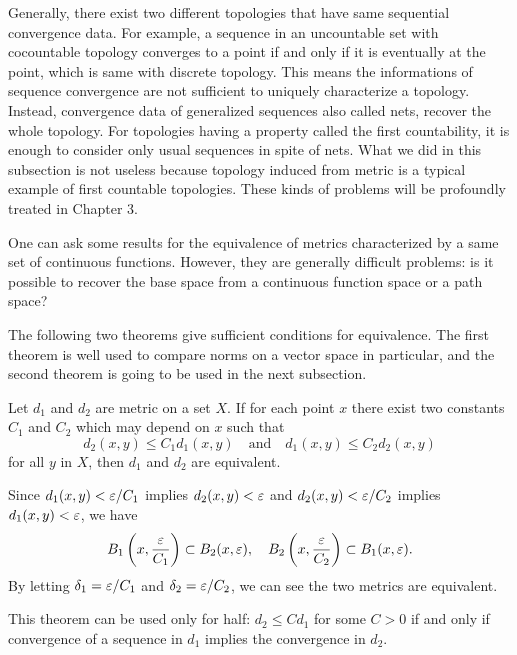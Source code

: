 \begin{rmk}
Generally, there exist two different topologies that have same sequential convergence data.
For example, a sequence in an uncountable set with cocountable topology converges to a point if and only if it is eventually at the point, which is same with discrete topology.
This means the informations of sequence convergence are not sufficient to uniquely characterize a topology.
Instead, convergence data of generalized sequences also called nets, recover the whole topology.
For topologies having a property called the first countability, it is enough to consider only usual sequences in spite of nets.
What we did in this subsection is not useless because topology induced from metric is a typical example of first countable topologies.
These kinds of problems will be profoundly treated in Chapter 3.
\end{rmk}
\begin{rmk}
One can ask some results for the equivalence of metrics characterized by a same set of continuous functions.
However, they are generally difficult problems: is it possible to recover the base space from a continuous function space or a path space?
\end{rmk}


The following two theorems give sufficient conditions for equivalence.
The first theorem is well used to compare norms on a vector space in particular, and the second theorem is going to be used in the next subsection.

\begin{thm}\label{thm:equivalent metrics by inequalities}
Let $d_1$ and $d_2$ are metric on a set $X$.
If for each point $x$ there exist two constants $C_1$ and $C_2$ which may depend on $x$ such that
\[d_2(x,y)\le C_1d_1(x,y)\quad\text{and}\quad d_1(x,y)\le C_2d_2(x,y)\]
for all $y$ in $X$, then $d_1$ and $d_2$ are equivalent.
\end{thm}
\begin{pf}
Since $d_1(x,y)<\varepsilon/C_1$ implies $d_2(x,y)<\varepsilon$ and $d_2(x,y)<\varepsilon/C_2$ implies $d_1(x,y)<\varepsilon$, we have
\[B_1\left(x,\frac{\varepsilon}{C_1}\right)\subset B_2(x,\varepsilon),\quad B_2\left(x,\frac{\varepsilon}{C_2}\right)\subset B_1(x,\varepsilon).\]
By letting $\delta_1=\varepsilon/C_1$ and $\delta_2=\varepsilon/C_2$, we can see the two metrics are equivalent.
\end{pf}
This theorem can be used only for half:  $d_2\le Cd_1$ for some $C>0$ if and only if convergence of a sequence in $d_1$ implies the convergence in $d_2$.

